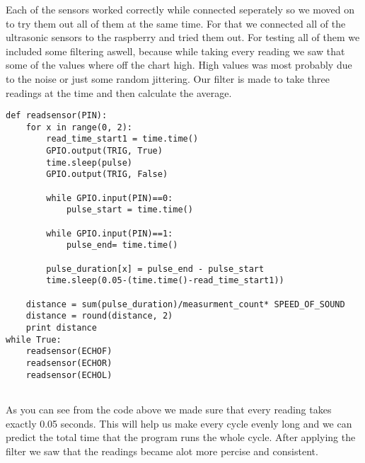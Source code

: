 Each of the sensors worked correctly while connected seperately so we moved on to try them out all of them at the same time.
For that we connected all of the ultrasonic sensors to the raspberry and tried them out.
For testing all of them we included some filtering aswell, because while taking every reading we saw that some of the values where off the chart high.
High values was most probably due to the noise or just some random jittering.
Our filter is made to take three readings at the time and then calculate the average.

\begin{lstlisting}
def readsensor(PIN):
	for x in range(0, 2):
		read_time_start1 = time.time()
		GPIO.output(TRIG, True)
		time.sleep(pulse)
		GPIO.output(TRIG, False)

		while GPIO.input(PIN)==0:
			pulse_start = time.time()

		while GPIO.input(PIN)==1:
			pulse_end= time.time()

		pulse_duration[x] = pulse_end - pulse_start
		time.sleep(0.05-(time.time()-read_time_start1))

	distance = sum(pulse_duration)/measurment_count* SPEED_OF_SOUND
	distance = round(distance, 2)
	print distance
while True:
	readsensor(ECHOF)
	readsensor(ECHOR)
	readsensor(ECHOL)
	
\end{lstlisting}

As you can see from the code above we made sure that every reading takes exactly 0.05 seconds.
This will help us make every cycle evenly long and we can predict the total time that the program runs the whole cycle.
After applying the filter we saw that the readings became alot more percise and consistent.

